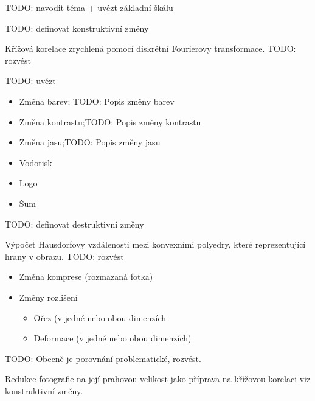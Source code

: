 TODO: navodit téma + uvézt základní škálu

TODO: definovat konstruktivní změny

Křížová korelace zrychlená pomocí diskrétní Fourierovy transformace.
TODO: rozvést

TODO: uvézt

\begin{itemize}
	\setlength{\parskip}{0pt}
	\setlength{\itemsep}{0pt}
	\item{Změna barev; TODO: Popis změny barev}
	\item{Změna kontrastu;TODO: Popis změny kontrastu}
	\item{Změna jasu;TODO: Popis změny jasu}
\end{itemize}

\begin{itemize}
	\setlength{\parskip}{0pt}
	\setlength{\itemsep}{0pt}
	\item{Vodotisk}
	\item{Logo}
	\item{Šum}
\end{itemize}

TODO: definovat destruktivní změny

Výpočet Hausdorfovy vzdálenosti mezi konvexními polyedry, které reprezentující hrany v obrazu.
TODO: rozvést

\begin{itemize}
	\setlength{\parskip}{0pt}
	\setlength{\itemsep}{0pt}
	\item{Změna komprese (rozmazaná fotka)}
	\item{Změny rozlišení}
	\begin{itemize}
		\item{Ořez (v jedné nebo obou dimenzích}
		\item{Deformace (v jedné nebo obou dimenzích)}
	\end{itemize}
\end{itemize}

TODO: Obecně je porovnání problematické, rozvést.

Redukce fotografie na její prahovou velikost jako příprava na křížovou korelaci viz konstruktivní změny.

